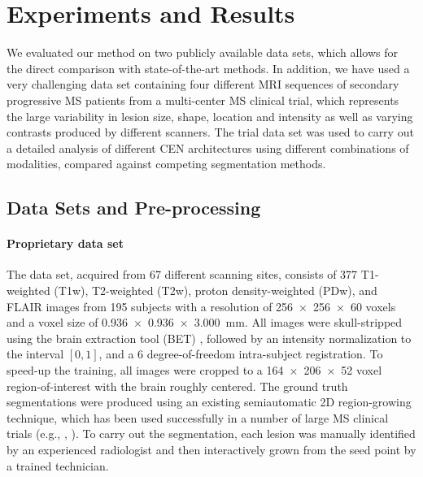 
\section{Experiments and Results}


We evaluated our method on two publicly available data sets, which allows for
the direct comparison with state-of-the-art methods. In addition, we have used a
very challenging data set containing four different MRI sequences of secondary
progressive MS patients from a multi-center MS clinical trial, which represents
the large variability in lesion size, shape, location and intensity as well as
varying contrasts produced by different scanners. The trial data set was used to
carry out a detailed analysis of different CEN architectures using different
combinations of modalities, compared against competing segmentation methods.

\subsection{Data Sets and Pre-processing}



\paragraph{Proprietary data set}

The data set, acquired from 67 different scanning sites, consists of 377
T1-weighted (T1w), T2-weighted (T2w), proton density-weighted (PDw), and FLAIR
images from 195 subjects with a resolution of \num{256x256x60} voxels and a
voxel size of \SI{0.936x0.936x3.000}{\milli\metre}. All images were
skull-stripped using the brain extraction tool (BET) \cite{jenkinson2005bet2},
followed by an intensity normalization to the interval $[0,1]$, and a 6
degree-of-freedom intra-subject registration. To speed-up the training, all
images were cropped to a \num{164x206x52} voxel region-of-interest with the
brain roughly centered. The ground truth segmentations were produced using an
existing semiautomatic 2D region-growing technique, which has been used
successfully in a number of large MS clinical trials (e.g.,
\cite{kappos2006long}, \cite{traboulsee2008reduction}). To carry out the
segmentation, each lesion was manually identified by an experienced radiologist
and then interactively grown from the seed point by a trained technician.

